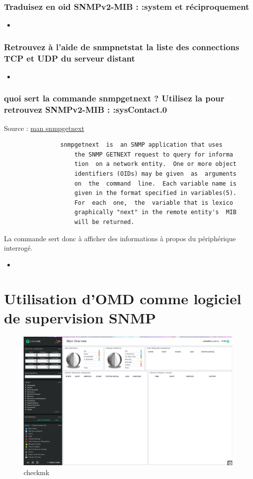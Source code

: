 \documentclass[10pt,a4paper]{article}
\newcommand{\insertcode}[2]{\begin{itemize}\item[]\end{itemize}}
\begin{document}
\subsubsection{Traduisez en oid SNMPv2-MIB : :system et réciproquement}
\insertcode{commande/7.txt}{Traduction}

\subsubsection{Retrouvez à l’aide de snmpnetstat la liste des connections TCP et UDP du serveur distant}
\insertcode{commande/8.txt}{snmpNetstat}


\subsubsection{ quoi sert la commande snmpgetnext ? Utilisez la pour retrouvez SNMPv2-MIB : :sysContact.0}
Source : \url{man snmpgetnext}
\begin{lstlisting}
                snmpgetnext  is  an SNMP application that uses
                    the SNMP GETNEXT request to query for informa
                    tion  on a network entity.  One or more object
                    identifiers (OIDs) may be given  as  arguments
                    on  the  command  line.  Each variable name is
                    given in the format specified in variables(5).
                    For  each  one,  the  variable that is lexico
                    graphically "next" in the remote entity's  MIB
                    will be returned.

\end{lstlisting}
La commande sert donc à afficher des informations à propos du périphérique interrogé.
\insertcode{commande/9.txt}{snmpgetnext}
\newpage
\section{Utilisation d’OMD comme logiciel de supervision SNMP}

 

  \begin{figure}[h!]
\centering
\includegraphics[scale=0.30]{screen/checkmk.png}
\caption{checkmk}
\label{fig:qos}
\end{figure}
\end{document}
